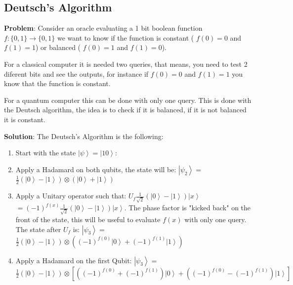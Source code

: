 \subsection{Deutsch's Algorithm}
\label{subsec: Deutsch}

\textbf{Problem}: Consider an oracle evaluating a 1 bit boolean function $f:\{ 0,1\} \rightarrow \{ 0,1\}$ we want to know if the function is constant ( $f(0) = 0$ and $f(1) = 1$) or balanced ( $f(0) = 1$ and $f(1) = 0$). 

For a classical computer it is needed two queries, that means, you need to test 2 diferent bits and see the outputs, for instance if $f(0) = 0$ and $f(1) = 1$ you know that the function is constant.

For a quantum computer this can be done with only one query. This is done with the Deutsch algorithm, the idea is to check if it is balanced, if it is not balanced it is constant.

\textbf{Solution}: The Deutsch's Algorithm is the following:
\begin{enumerate}
    \item Start with the state $\left| \psi \right> = \left| 10 \right>$:
    
    \item  Apply a Hadamard on both qubits, the state will be: $\left| \psi_2     \right> =$ $\frac{1}{2} \left( \left| 0 \right> - \left| 1 \right> \right)     \otimes \left( \left| 0 \right> + \left| 1 \right> \right) $
    
    \item  Apply a Unitary operator such that:  $U_f  \frac{1}{\sqrt 2} \left(     \left| 0 \right> - \left| 1 \right> \right)\left| x \right> $ $ =     (-1)^{f(x)} \frac{1}{\sqrt 2} \left( \left| 0 \right> - \left| 1 \right>     \right)\left| x \right>$. The phase factor is "kicked back" on the front of     the state, this will be useful to evaluate $f(x)$ with only one query. The     state after $U_f$ is: $\left| \psi_3 \right> =$ $\frac{1}{2} \left( \left|     0 \right> - \left| 1 \right> \right) \otimes \left( (-1)^{f(0)}\left| 0     \right> + (-1)^{f(1)}\left| 1 \right> \right) $
    
    \item  Apply a Hadamard on the first Qubit: $\left| \psi_3 \right> =$     $\frac{1}{2} \left( \left| 0 \right> - \left| 1 \right> \right) \otimes     \left[ \left((-1)^{f(0)} + (-1)^{f(1)}\right) \left| 0 \right> +     \left((-1)^{f(0)} - (-1)^{f(1)}\right)\left| 1 \right> \right] $
\end{enumerate}

